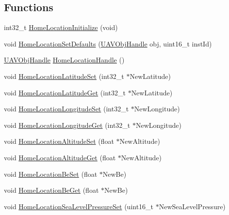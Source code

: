 \subsection*{\-Functions}
\begin{DoxyCompactItemize}
\item 
int32\-\_\-t \hyperlink{group___home_location_gad85f8b5f76043ab0067b5c5b9018bedb}{\-Home\-Location\-Initialize} (void)
\item 
void \hyperlink{group___home_location_ga65eee7f5a1dd28332bef992df43d3a10}{\-Home\-Location\-Set\-Defaults} (\hyperlink{targets_2_u_a_v_objects_2inc_2uavobjectmanager_8h_a279053e22be53ce9f895043aaeb91e3b}{\-U\-A\-V\-Obj\-Handle} obj, uint16\-\_\-t inst\-Id)
\item 
\hyperlink{targets_2_u_a_v_objects_2inc_2uavobjectmanager_8h_a279053e22be53ce9f895043aaeb91e3b}{\-U\-A\-V\-Obj\-Handle} \hyperlink{group___home_location_ga64624a3b7c865ebcf3bb2d8d9bb2c105}{\-Home\-Location\-Handle} ()
\item 
void \hyperlink{group___home_location_ga05881db7ce919ef84bf18e69ce93ec81}{\-Home\-Location\-Latitude\-Set} (int32\-\_\-t $\ast$\-New\-Latitude)
\item 
void \hyperlink{group___home_location_ga7e8302e1b3d13130e58f7dd8e326832a}{\-Home\-Location\-Latitude\-Get} (int32\-\_\-t $\ast$\-New\-Latitude)
\item 
void \hyperlink{group___home_location_ga5207d8419680e31259e4c486c140db6a}{\-Home\-Location\-Longitude\-Set} (int32\-\_\-t $\ast$\-New\-Longitude)
\item 
void \hyperlink{group___home_location_ga7403cd976d3df1571e34ed9fa9df5efb}{\-Home\-Location\-Longitude\-Get} (int32\-\_\-t $\ast$\-New\-Longitude)
\item 
void \hyperlink{group___home_location_gaa9a1967ec0ee11ae9435890f7e78b797}{\-Home\-Location\-Altitude\-Set} (float $\ast$\-New\-Altitude)
\item 
void \hyperlink{group___home_location_gabd8779c49b9784ff84988de9f7dbdd1d}{\-Home\-Location\-Altitude\-Get} (float $\ast$\-New\-Altitude)
\item 
void \hyperlink{group___home_location_ga1b3c2a0fdc95152946918fba8a0e9def}{\-Home\-Location\-Be\-Set} (float $\ast$\-New\-Be)
\item 
void \hyperlink{group___home_location_ga868aacbb9797aeb85ecf5212938b1e7b}{\-Home\-Location\-Be\-Get} (float $\ast$\-New\-Be)
\item 
void \hyperlink{group___home_location_ga2ebeb3e667a8e7acb88a654f0e31ca0f}{\-Home\-Location\-Sea\-Level\-Pressure\-Set} (uint16\-\_\-t $\ast$\-New\-Sea\-Level\-Pressure)

\end{DoxyCompactItemize}
